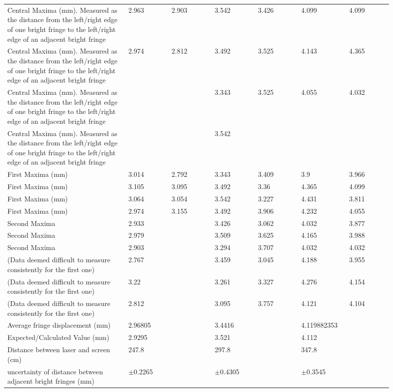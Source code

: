 \documentclass[12pt]{article}
\begin{document}
\begin{longtable}{p{0.28\linewidth}p{0.105\linewidth}p{0.105\linewidth}p{0.105\linewidth}p{0.105\linewidth}p{0.105\linewidth}p{0.105\linewidth}}
Central Maxima (mm). Measured as the distance from the left/right edge of one bright fringe to the left/right edge of an adjacent bright fringe & 2.963 & 2.903 & 3.542 & 3.426 & 4.099 & 4.099 \\
Central Maxima (mm). Measured as the distance from the left/right edge of one bright fringe to the left/right edge of an adjacent bright fringe & 2.974 & 2.812 & 3.492 & 3.525 & 4.143 & 4.365 \\
Central Maxima (mm). Measured as the distance from the left/right edge of one bright fringe to the left/right edge of an adjacent bright fringe &  &  & 3.343 & 3.525 & 4.055 & 4.032 \\
Central Maxima (mm). Measured as the distance from the left/right edge of one bright fringe to the left/right edge of an adjacent bright fringe &  &  & 3.542 &  &  &  \\
First Maxima (mm) & 3.014 & 2.792 & 3.343 & 3.409 & 3.9 & 3.966 \\
First Maxima (mm) & 3.105 & 3.095 & 3.492 & 3.36 & 4.365 & 4.099 \\
First Maxima (mm) & 3.064 & 3.054 & 3.542 & 3.227 & 4.431 & 3.811 \\
First Maxima (mm) & 2.974 & 3.155 & 3.492 & 3.906 & 4.232 & 4.055 \\
Second Maxima & 2.933 &  & 3.426 & 3.062 & 4.032 & 3.877 \\
Second Maxima & 2.979 &  & 3.509 & 3.625 & 4.165 & 3.988 \\
Second Maxima & 2.903 &  & 3.294 & 3.707 & 4.032 & 4.032 \\
(Data deemed difficult to measure consistently for the first one) & 2.767 &  & 3.459 & 3.045 & 4.188 & 3.955 \\
(Data deemed difficult to measure consistently for the first one) & 3.22 &  & 3.261 & 3.327 & 4.276 & 4.154 \\
(Data deemed difficult to measure consistently for the first one) & 2.812 &  & 3.095 & 3.757 & 4.121 & 4.104 \\
Average fringe displacement (mm) & 2.96805 &  & 3.4416 &  & 4.119882353 &  \\
Expected/Calculated Value (mm) & 2.9295 &  & 3.521 &  & 4.112 &  \\
Distance between laser and screen (cm) & 247.8 &  & 297.8 &  & 347.8 &  \\
uncertainty of distance between adjacent bright fringes (mm) & \ensuremath{\pm}0.2265 &  & \ensuremath{\pm}0.4305 &  & \ensuremath{\pm}0.3545 &  \\
\hline
\end{longtable}
\end{document}
